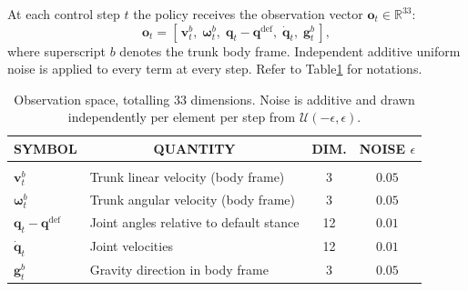 \documentclass{article} %
\begin{document}
At each control step $t$ the policy receives the observation vector
$\mathbf{o}_t \in \mathbb{R}^{33}$:
\begin{equation}
\mathbf{o}_t = \left[\, \mathbf{v}^{b}_t,\; \boldsymbol{\omega}^{b}_t,\;
\mathbf{q}_t - \mathbf{q}^{\mathrm{def}},\; \dot{\mathbf{q}}_t,\;
\mathbf{g}^{b}_t \,\right],
\label{eq:obs}
\end{equation}
where superscript $b$ denotes the trunk body frame. Independent additive
uniform noise is applied to every term at every step. Refer to Table\ref{tab:obs} for notations.

\begin{table}[h]
\caption{Observation space, totalling 33 dimensions. Noise is additive and
drawn independently per element per step from $\mathcal{U}(-\epsilon,
\epsilon)$.}
\label{tab:obs}
\begin{center}
\begin{tabular}{llcc}
\multicolumn{1}{c}{\bf SYMBOL} & \multicolumn{1}{c}{\bf QUANTITY}
& \multicolumn{1}{c}{\bf DIM.} & \multicolumn{1}{c}{\bf NOISE $\epsilon$} \\
\hline \\
$\mathbf{v}^{b}_t$ & Trunk linear velocity (body frame) & 3 & $0.05$ \\
$\boldsymbol{\omega}^{b}_t$ & Trunk angular velocity (body frame) & 3 & $0.05$ \\
$\mathbf{q}_t - \mathbf{q}^{\mathrm{def}}$ & Joint angles relative to default
stance & 12 & $0.01$ \\
$\dot{\mathbf{q}}_t$ & Joint velocities & 12 & $0.01$ \\
$\mathbf{g}^{b}_t$ & Gravity direction in body frame & 3 & $0.05$ \\
\end{tabular}
\end{center}
\end{table}
\end{document}
